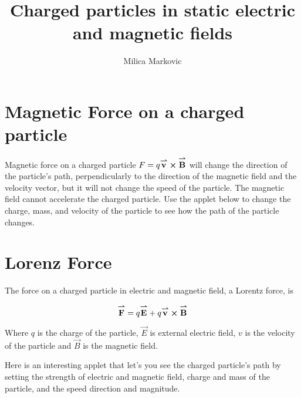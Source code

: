 \documentclass{ximera}
\title{Charged particles in static electric and magnetic fields}
\author{Milica Markovic}
\begin{document}
  
\begin{abstract}  

\end{abstract}  
\maketitle    


\section{Magnetic Force on a charged particle}

Magnetic force on a charged particle $F=q {\overset{\boldsymbol{\rightharpoonup}}{\mathbf{v}}}\hspace{0in} \boldsymbol\times {\overset{\boldsymbol{\rightharpoonup}}{\mathbf{B}}}\hspace{0in}$ will change the direction of the particle's path, perpendicularly to the direction of the magnetic field and the velocity vector, but it will not change the speed of the particle. The magnetic field cannot accelerate the charged particle. Use the applet below to change the charge, mass, and velocity of the particle to see how the path of the particle changes.




\section{Lorenz Force}

The force on a charged particle in electric and magnetic field, a Lorentz force, is  

\begin{equation}
{\overset{\boldsymbol{\rightharpoonup}}{\mathbf{F}}}\hspace{0in}=q{\overset{\boldsymbol{\rightharpoonup}}{\mathbf{E}}}\hspace{0in} + q {\overset{\boldsymbol{\rightharpoonup}}{\mathbf{v}}}\hspace{0in} \boldsymbol\times {\overset{\boldsymbol{\rightharpoonup}}{\mathbf{B}}}\hspace{0in}
\end{equation}

Where $q$ is the charge of the particle, $\vec{E}$ is external electric field, $v$ is the velocity of the particle and $\vec{B}$ is the magnetic field.


Here is an interesting applet that let's you see the charged particle's path by setting the strength of electric and magnetic field, charge and mass of the particle, and the speed direction and magnitude.


\end{document}
